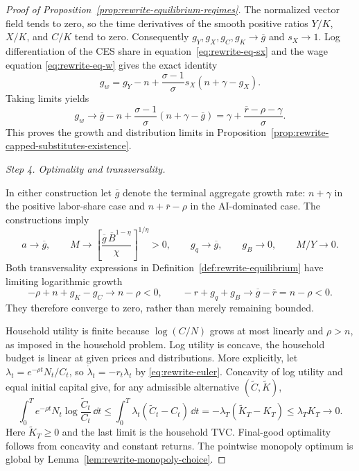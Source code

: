 \begin{proof}[Proof of Proposition~\ref{prop:rewrite-equilibrium-regimes}]
The normalized vector field tends to zero, so the time derivatives of the
smooth positive ratios $Y/K$, $X/K$, and $C/K$ tend to zero.
Consequently $g_Y,g_X,g_C,g_K\to\overline g$ and $s_X\to1$.
Log differentiation of the CES share in
equation~\eqref{eq:rewrite-eq-sx} and the wage equation
\eqref{eq:rewrite-eq-w} gives the exact identity
\[
 g_w=g_Y-n+\frac{\sigma-1}{\sigma}s_X(n+\gamma-g_X).
\]
Taking limits yields
\[
 g_w\to\overline g-n+\frac{\sigma-1}{\sigma}(n+\gamma-\overline g)
 =\gamma+\frac{\overline r-\rho-\gamma}{\sigma}.
\]
This proves the growth and distribution limits in
Proposition~\ref{prop:rewrite-capped-substitutes-existence}.

\par\medskip\noindent\textit{Step 4. Optimality and transversality.}

In either construction let $\overline g$ denote the terminal aggregate
growth rate: $n+\gamma$ in the positive labor-share case and
$n+\overline r-\rho$ in the AI-dominated case. The constructions imply
\[
 a\to\overline g,\qquad
 M\to\left[\frac{\overline g\,\overline B^{1-\eta}}{\chi}\right]^{1/\eta}>0,
 \qquad g_q\to\overline g,\qquad g_B\to0,\qquad M/Y\to0.
\]
Both transversality expressions in Definition~\ref{def:rewrite-equilibrium}
have limiting logarithmic growth
\begin{equation}
 -\rho+n+g_K-g_C\to n-\rho<0,\qquad
 -r+g_q+g_B\to\overline g-\overline r=n-\rho<0.
 \label{eq:rewrite-finite-existence-tvcs}
\end{equation}
They therefore converge to zero, rather than merely remaining bounded.

Household utility is finite because $\log(C/N)$ grows at most linearly and
$\rho>n$, as imposed in the household problem. Log utility is concave, the
household budget is linear at given prices and distributions. More explicitly,
let $\lambda_t=e^{-\rho t}N_t/C_t$, so $\dot\lambda_t=-r_t\lambda_t$ by
\eqref{eq:rewrite-euler}. Concavity of log utility and equal initial capital
give, for any admissible alternative $(\widetilde C,\widetilde K)$,
\[
 \int_0^T e^{-\rho t}N_t
 \log\frac{\widetilde C_t}{C_t}\,\dd t
 \leq\int_0^T\lambda_t(\widetilde C_t-C_t)\,\dd t
 =-\lambda_T(\widetilde K_T-K_T)\leq\lambda_TK_T\to0.
\]
Here $\widetilde K_T\geq0$ and the last limit is the household TVC.
Final-good optimality follows from concavity and constant returns.
The pointwise monopoly optimum is global by
Lemma~\ref{lem:rewrite-monopoly-choice}.


\end{proof}
